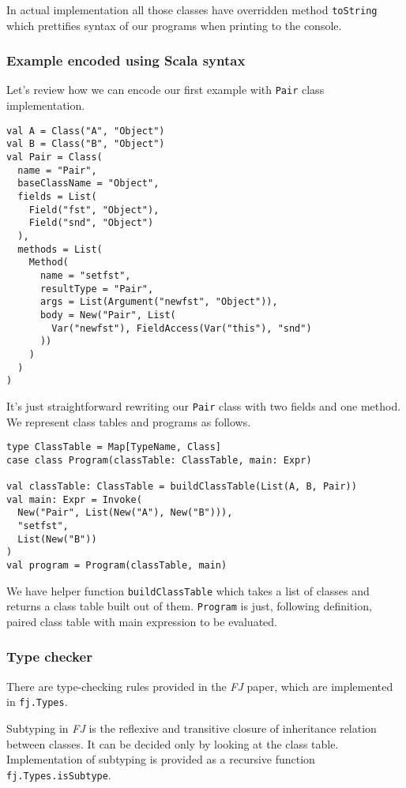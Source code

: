 \documentclass{article}[12pt]
\begin{document}
In actual implementation all those classes have overridden
method \texttt{toString} which prettifies syntax of our
programs when printing to the console.

\subsubsection{Example encoded using Scala syntax}

Let's review how we can encode our first example with
\texttt{Pair} class implementation.

\begin{verbatim}
val A = Class("A", "Object")
val B = Class("B", "Object")
val Pair = Class(
  name = "Pair",
  baseClassName = "Object",
  fields = List(
    Field("fst", "Object"),
    Field("snd", "Object")
  ),
  methods = List(
    Method(
      name = "setfst",
      resultType = "Pair",
      args = List(Argument("newfst", "Object")),
      body = New("Pair", List(
        Var("newfst"), FieldAccess(Var("this"), "snd")
      ))
    )
  )
)
\end{verbatim}
It's just straightforward rewriting our \texttt{Pair} class
with two fields and one method. We represent class tables and
programs as follows.

\begin{verbatim}
type ClassTable = Map[TypeName, Class]
case class Program(classTable: ClassTable, main: Expr)

val classTable: ClassTable = buildClassTable(List(A, B, Pair))
val main: Expr = Invoke(
  New("Pair", List(New("A"), New("B"))),
  "setfst",
  List(New("B"))
)
val program = Program(classTable, main)
\end{verbatim}

We have helper function \texttt{buildClassTable} which takes a list
of classes and returns a class table built out of them.
\texttt{Program} is just, following definition, paired class table
with main expression to be evaluated.

\subsubsection{Type checker}

There are type-checking rules provided in the \emph{FJ} paper,
which are implemented in \texttt{fj.Types}.

Subtyping in \emph{FJ} is the reflexive and transitive closure of
inheritance relation between classes. It can be decided only by
looking at the class table. Implementation of subtyping is provided
as a recursive function \texttt{fj.Types.isSubtype}.
\end{document}
